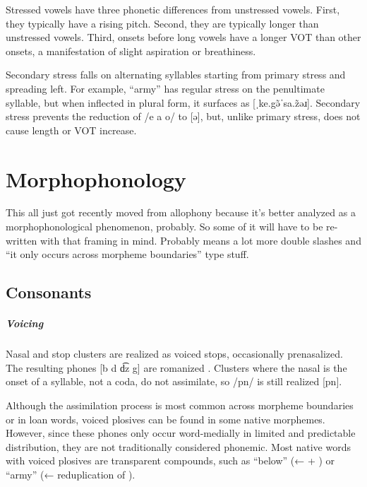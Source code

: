 Stressed vowels have three phonetic differences from unstressed vowels. First, they typically have a rising pitch. Second, they are typically longer than unstressed vowels. Third, onsets before long vowels have a longer VOT than other onsets, a manifestation of slight aspiration or breathiness.

Secondary stress falls on alternating syllables starting from primary stress and spreading left. For example,  “army” has regular stress on the penultimate syllable, but when inflected in plural form, it surfaces as  [ˌke.gə̃ˈsa.z̃əɹ]. Secondary stress prevents the reduction of /e a o/ to [ə], but, unlike primary stress, does not cause length or VOT increase.

\setchapterpreamble[u]{\margintoc}
\chapter{Morphophonology}
\begin{kaobox}[frametitle=\sc todo:]
This all just got recently moved from allophony because it's better analyzed as a morphophonological phenomenon, probably. So some of it will have to be re-written with that framing in mind. Probably means a lot more double slashes and “it only occurs across morpheme boundaries” type stuff.
\end{kaobox}
\section{Consonants} \label{sec:conso_morphono}
\paragraph{Voicing}
Nasal and stop clusters are realized as voiced stops, occasionally prenasalized. The resulting phones [b d d͡z g] are romanized .  Clusters where the nasal is the onset of a syllable, not a coda, do not assimilate, so /pn/ is still realized [pn]. 

Although the assimilation process is most common across morpheme boundaries or in loan words, voiced plosives can be found in some native morphemes. However, since these phones only occur word-medially in limited and predictable distribution, they are not traditionally considered phonemic.  Most native words with voiced plosives are transparent compounds, such as  “below” (←  + ) or  “army” (← reduplication of ).

